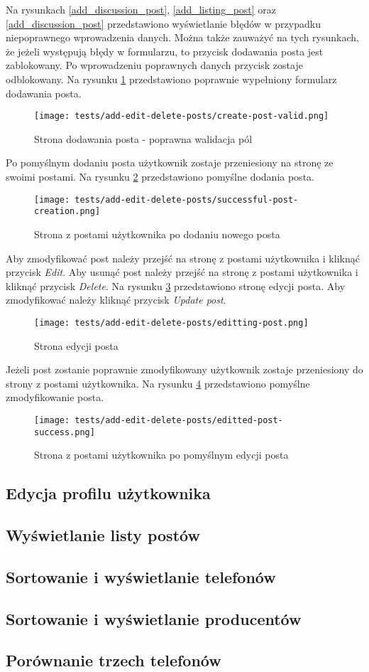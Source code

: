 Na rysunkach \ref{add_discussion_post}, \ref{add_listing_post} oraz \ref{add_discussion_post} przedstawiono wyświetlanie błędów w przypadku niepoprawnego wprowadzenia danych. Można także zauważyć na tych rysunkach, że jeżeli występują błędy w formularzu, to przycisk dodawania posta jest zablokowany. Po wprowadzeniu poprawnych danych przycisk zostaje odblokowany. Na rysunku \ref{add_valid_post} przedstawiono poprawnie wypełniony formularz dodawania posta.
\begin{figure}[H]
  \centering
  \texttt{[image: tests/add-edit-delete-posts/create-post-valid.png]}
  \caption{Strona dodawania posta - poprawna walidacja pól}
  \label{add_valid_post}
\end{figure}
Po pomyślnym dodaniu posta użytkownik zostaje przeniesiony na stronę ze swoimi postami. Na rysunku \ref{add_post_success} przedstawiono pomyślne dodania posta.
\begin{figure}[H]
  \centering
  \texttt{[image: tests/add-edit-delete-posts/successful-post-creation.png]}
  \caption{Strona z postami użytkownika po dodaniu nowego posta}
  \label{add_post_success}
\end{figure}
Aby zmodyfikować post należy przejść na stronę z postami użytkownika i kliknąć przycisk \textit{Edit}. Aby usunąć post należy przejść na stronę z postami użytkownika i kliknąć przycisk \textit{Delete}. Na rysunku \ref{edit_post} przedstawiono stronę edycji posta. Aby zmodyfikować należy kliknąć przycisk \textit{Update post}. 
\begin{figure}[H]
  \centering
  \texttt{[image: tests/add-edit-delete-posts/editting-post.png]}
  \caption{Strona edycji posta}
  \label{edit_post}
\end{figure}
Jeżeli post zostanie poprawnie zmodyfikowany użytkownik zostaje przeniesiony do strony z postami użytkownika. Na rysunku \ref{edit_post_success} przedstawiono pomyślne zmodyfikowanie posta.
\begin{figure}[H]
  \centering
  \texttt{[image: tests/add-edit-delete-posts/editted-post-success.png]}
  \caption{Strona z postami użytkownika po pomyślnym edycji posta}
  \label{edit_post_success}
\end{figure}

\subsection{Edycja profilu użytkownika}

\subsection{Wyświetlanie listy postów}

\subsection{Sortowanie i wyświetlanie telefonów}

\subsection{Sortowanie i wyświetlanie producentów}

\subsection{Porównanie trzech telefonów}
